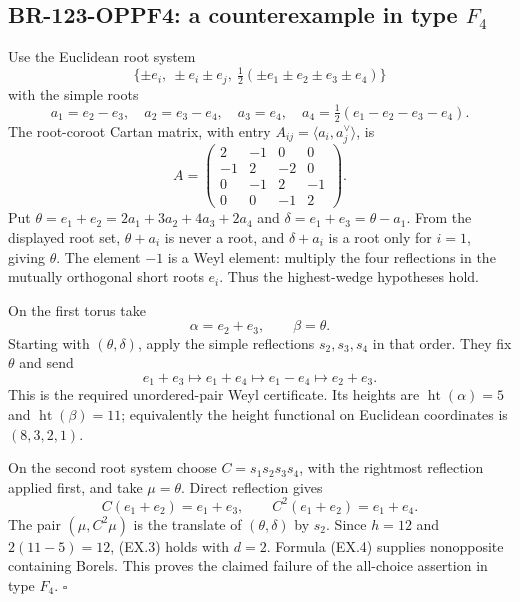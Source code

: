 \subsection{BR-123-OPPF4: a counterexample in type \texorpdfstring{$F_4$}{F4}}
Use the Euclidean root system
\[
 \{\pm e_i,\ \pm e_i\pm e_j,\
             \tfrac12(\pm e_1\pm e_2\pm e_3\pm e_4)\}
\]
with the simple roots
\[
 a_1=e_2-e_3,\quad a_2=e_3-e_4,\quad a_3=e_4,\quad
 a_4=\tfrac12(e_1-e_2-e_3-e_4).
 \tag{EX.5}
\]
The root-coroot Cartan matrix, with entry
$A_{ij}=\langle a_i,a_j^\vee\rangle$, is
\[
 A=\begin{pmatrix}
 2&-1&0&0\\-1&2&-2&0\\0&-1&2&-1\\0&0&-1&2
 \end{pmatrix}.
\]
Put $\theta=e_1+e_2=2a_1+3a_2+4a_3+2a_4$ and
$\delta=e_1+e_3=\theta-a_1$.  From the displayed root set,
$\theta+a_i$ is never a root, and $\delta+a_i$ is a root only
for $i=1$, giving $\theta$.  The element $-1$ is a Weyl element:
multiply the four reflections in the mutually orthogonal short
roots $e_i$.  Thus the highest-wedge hypotheses hold.

On the first torus take
\[
                 \alpha=e_2+e_3,
                 \qquad\beta=\theta.
\]
Starting with $(\theta,\delta)$, apply the simple reflections
$s_2,s_3,s_4$ in that order.  They fix $\theta$ and send
\[
 e_1+e_3\longmapsto e_1+e_4
       \longmapsto e_1-e_4\longmapsto e_2+e_3.
\]
This is the required unordered-pair Weyl certificate.  Its heights
are $\operatorname{ht}(\alpha)=5$ and
$\operatorname{ht}(\beta)=11$; equivalently the height functional
on Euclidean coordinates is $(8,3,2,1)$.

On the second root system choose $C=s_1s_2s_3s_4$, with the rightmost
reflection applied first, and take $\mu=\theta$.  Direct reflection
gives
\[
 C(e_1+e_2)=e_1+e_3,\qquad C^2(e_1+e_2)=e_1+e_4.
\]
The pair $(\mu,C^2\mu)$ is the translate of
$(\theta,\delta)$ by $s_2$.  Since $h=12$ and
$2(11-5)=12$, (EX.3) holds with $d=2$.  Formula (EX.4) supplies
nonopposite containing Borels.  This proves the claimed failure
of the all-choice assertion in type $F_4$.  $\square$

